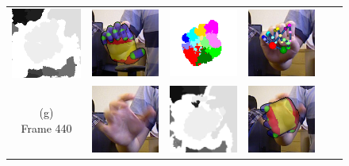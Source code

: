 \begin{figure}
\begin{tabular}{@{}cc@{}c@{}c@{}c@{}c@{}}
		\includegraphics[width=2.4cm]{fig/hand/qual/depth/image_0198.png} &
		\includegraphics[width=2.4cm]{fig/hand/qual/forth/image_0198.png} &
		\includegraphics[width=2.4cm]{fig/hand/qual/class/class-198.png} &
		\includegraphics[width=2.4cm]{fig/hand/qual/vote/image_0198.png} 
		\label{fig/hand/multi6} \\
		\raisebox{1cm}{\parbox{2cm}{\centering (g)\\Frame 440}} & 
		\includegraphics[width=2.4cm]{fig/hand/qual/rgb/image_0440.png} &
		\includegraphics[width=2.4cm]{fig/hand/qual/depth/image_0440.png} &
		\includegraphics[width=2.4cm]{fig/hand/qual/forth/image_0440.png} &

\end{tabular}
\end{figure}
